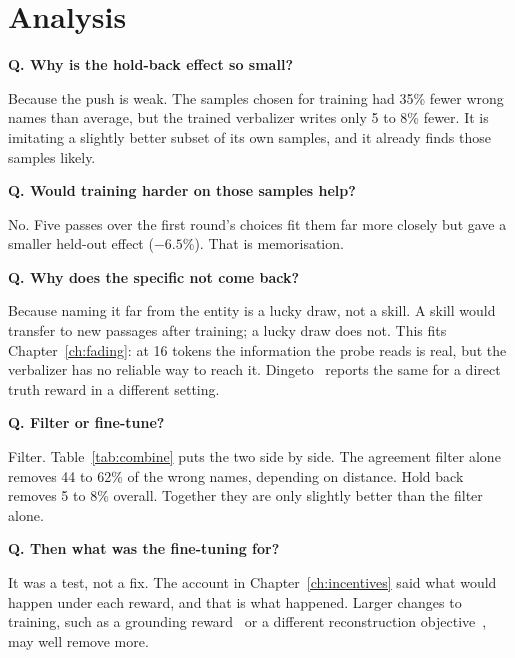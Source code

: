 \section{Analysis}

\newcommand{\question}[1]{\medskip\noindent\textbf{Q. #1}\par\nopagebreak\smallskip\noindent\ignorespaces}

\question{Why is the hold-back effect so small?}
Because the push is weak. The samples chosen for training had 35\% fewer wrong names than average, but the
trained verbalizer writes only 5 to 8\% fewer. It is imitating a slightly better subset of its own samples,
and it already finds those samples likely.

\question{Would training harder on those samples help?}
No. Five passes over the first round's choices fit them far more closely but gave a smaller held-out effect
($-6.5\%$). That is memorisation.

\question{Why does the specific not come back?}
Because naming it far from the entity is a lucky draw, not a skill. A skill would transfer to new passages
after training; a lucky draw does not. This fits Chapter~\ref{ch:fading}: at 16 tokens the information the
probe reads is real, but the verbalizer has no reliable way to reach it. Dingeto~\cite{dingeto2026recap}
reports the same for a direct truth reward in a different setting.

\question{Filter or fine-tune?}
Filter. Table~\ref{tab:combine} puts the two side by side. The agreement filter alone removes 44 to 62\% of
the wrong names, depending on distance. Hold back removes 5 to 8\% overall. Together they are only slightly
better than the filter alone.

\begin{table}[t]
\centering
\footnotesize
\setlength{\tabcolsep}{4pt}

\caption[The filter and fine-tuning compared]{Wrong names per explanation with fine-tuning (the first hold-back run),
with the two-of-four agreement filter, and with both. Natural text, held-out passages; 95\% intervals.}
\label{tab:combine}
\end{table}

\question{Then what was the fine-tuning for?}
It was a test, not a fix. The account in Chapter~\ref{ch:incentives} said what would happen under each
reward, and that is what happened. Larger changes to training, such as a grounding
reward~\cite{hong2026grounding} or a different reconstruction objective~\cite{lek2026flownla}, may well
remove more.

